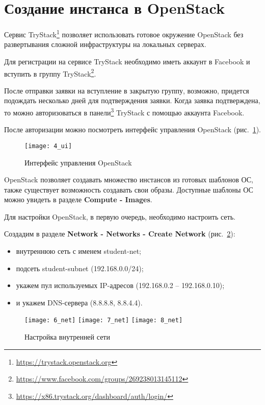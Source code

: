 \section{Создание инстанса в OpenStack} \label{pril:f}

Сервис TryStack\footnote{\url{https://trystack.openstack.org}} позволяет использовать готовое окружение OpenStack без развертывания сложной инфраструктуры на локальных серверах.

Для регистрации на сервисе TryStack необходимо иметь аккаунт в Facebook и вступить в группу TryStack\footnote{\url{https://www.facebook.com/groups/269238013145112}}.

После отправки заявки на вступление в закрытую группу, возможно, придется подождать несколько дней для подтверждения заявки.
Когда заявка подтверждена, то можно авторизоваться в панели\footnote{\url{https://x86.trystack.org/dashboard/auth/login/}} TryStack с помощью аккаунта Facebook.

После авторизации можно посмотреть интерфейс управления OpenStack (рис.~\ref{pic:ui}).
\begin{figure}[ht]
    \centering
    \texttt{[image: 4\_ui]}
    \caption{Интерфейс управления OpenStack}\label{pic:ui}
\end{figure}

OpenStack позволяет создавать множество инстансов из готовых шаблонов ОС, также существует возможность создавать свои образы.
Доступные шаблоны ОС можно увидеть в разделе \textbf{Compute - Images}.

Для настройки OpenStack, в первую очередь, необходимо настроить сеть.

Создадим в разделе \textbf{Network - Networks - Create Network} (рис.~\ref{pic:net}):
\begin{itemize}
    \item внутреннюю сеть с именем student-net;
    \item подсеть student-subnet (192.168.0.0/24);
    \item укажем пул используемых IP-адресов (192.168.0.2 -- 192.168.0.10);
    \item и укажем DNS-сервера (8.8.8.8, 8.8.4.4).
\end{itemize}

\begin{figure}[ht]
    \centering
    \texttt{[image: 6\_net]}
    \texttt{[image: 7\_net]}
    \texttt{[image: 8\_net]}
    \caption{Настройка внутренней сети}\label{pic:net}
\end{figure}

